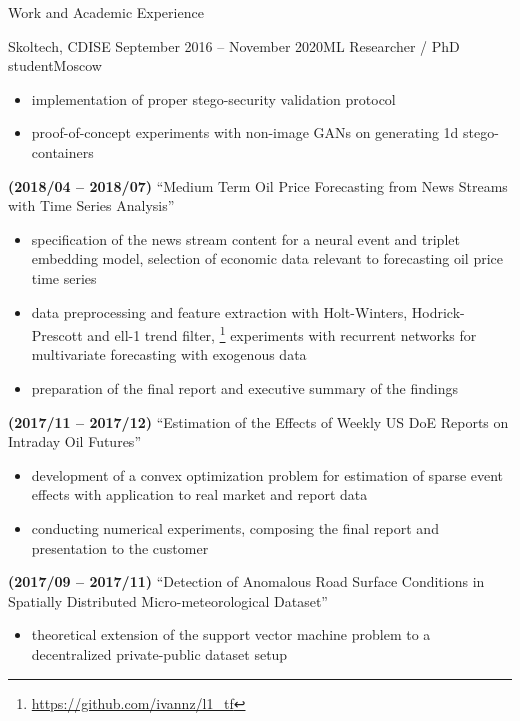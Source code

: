 \documentclass{resume} %
\begin{document}
\begin{rSection}{Work and Academic Experience}
\begin{rSubsection}{
        Skoltech, CDISE
    }{September 2016 -- November 2020}{ML Researcher / PhD student}{Moscow}
\begin{itemize}
        \item implementation of proper stego-security validation protocol

        \item proof-of-concept experiments with non-image GANs on generating 1d stego-containers
    \end{itemize}

    \item \textbf{(2018/04 -- 2018/07)}
    ``Medium Term Oil Price Forecasting from News Streams with Time Series Analysis''
    \begin{itemize}
        \item specification of the news stream content for a neural event and triplet embedding model, selection of economic data relevant to forecasting oil price time series

        \item data preprocessing and feature extraction with Holt-Winters, Hodrick-Prescott and ell-1 trend filter,%
        \footnote{
            \url{https://github.com/ivannz/l1_tf}
        }
        experiments with recurrent networks for multivariate forecasting with exogenous data

        \item preparation of the final report and executive summary of the findings
    \end{itemize}

    \item \textbf{(2017/11 -- 2017/12)}
    ``Estimation of the Effects of Weekly US DoE Reports on Intraday Oil Futures''
    \begin{itemize}
        \item development of a convex optimization problem for estimation of sparse event effects with application to real market and report data

        \item conducting numerical experiments, composing the final report and presentation to the customer
    \end{itemize}

    \item \textbf{(2017/09 -- 2017/11)}
    ``Detection of Anomalous Road Surface Conditions in Spatially Distributed Micro-meteorological Dataset''
    \begin{itemize}
        \item theoretical extension of the support vector machine problem to a decentralized private-public dataset setup


\end{itemize}
\end{rSubsection}
\end{rSection}
\end{document}
